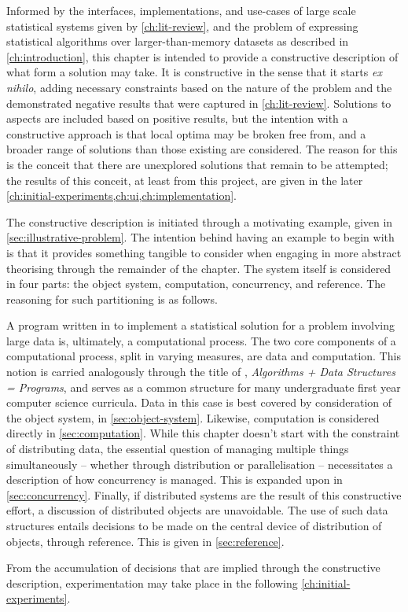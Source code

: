 Informed by the interfaces, implementations, and use-cases of large scale statistical systems given by \cref{ch:lit-review}, and the problem of expressing statistical algorithms over larger-than-memory datasets as described in \cref{ch:introduction}, this chapter is intended to provide a constructive description of what form a solution may take.
It is constructive in the sense that it starts \textit{ex nihilo}, adding necessary constraints based on the nature of the problem and the demonstrated negative results that were captured in \cref{ch:lit-review}.
Solutions to aspects are included based on positive results, but the intention with a constructive approach is that local optima may be broken free from, and a broader range of solutions than those existing are considered.
The reason for this is the conceit that there are unexplored solutions that remain to be attempted; the results of this conceit, at least from this project, are given in the later \cref{ch:initial-experiments,ch:ui,ch:implementation}.

The constructive description is initiated through a motivating example, given in \cref{sec:illustrative-problem}.
The intention behind having an example to begin with is that it provides something tangible to consider when engaging in more abstract theorising through the remainder of the chapter.
The system itself is considered in four parts: the object system, computation, concurrency, and reference.
The reasoning for such partitioning is as follows.

A program written in \R{} to implement a statistical solution for a problem involving large data is, ultimately, a computational process.
The two core components of a computational process, split in varying measures, are data and computation\cite{abelson1996sicp}.
This notion is carried analogously through the title of \textcite{wirth1985algorithms}, \textit{Algorithms + Data Structures = Programs}, and serves as a common structure for many undergraduate first year computer science curricula.
Data in this case is best covered by consideration of the object system, in \cref{sec:object-system}.
Likewise, computation is considered directly in \cref{sec:computation}.
While this chapter doesn't start with the constraint of distributing data, the essential question of managing multiple things simultaneously -- whether through distribution or parallelisation -- necessitates a description of how concurrency is managed.
This is expanded upon in \cref{sec:concurrency}.
Finally, if distributed systems are the result of this constructive effort, a discussion of distributed objects are unavoidable.
The use of such data structures entails decisions to be made on the central device of distribution of objects, through reference.
This is given in \cref{sec:reference}.

From the accumulation of decisions that are implied through the constructive description, experimentation may take place in the following \cref{ch:initial-experiments}.
